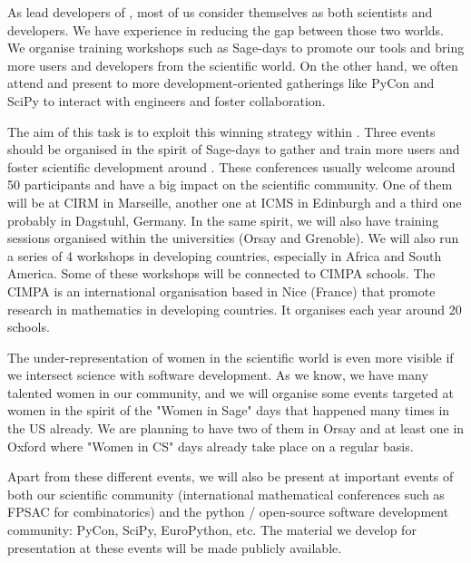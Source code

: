 \begin{workpackage}
\begin{tasklist}
\begin{task}[title=Dissemination: reaching towards users and fostering diversity, lead=PS,PM=12, partners={UB,USH,SA}, id=dissemination, wphases=0-48, issue=28]
  As lead developers of \TheProject, most of us consider themselves as
  both scientists and developers. We have experience in reducing the
  gap between those two worlds. We organise training workshops such
  as Sage-days to promote our tools and bring more users and
  developers from the scientific world. On the other hand, we often
  attend and present to more development-oriented gatherings like
  PyCon and SciPy to interact with engineers and foster
  collaboration.

  The aim of this task is to exploit this winning strategy within
  \TheProject. Three events should be organised in the spirit of
  Sage-days to gather and train more users and foster scientific
  development around \TheProject. These conferences usually welcome
  around 50 participants and have a big impact on the scientific
  community. One of them will be at CIRM in Marseille, another one at
  ICMS in Edinburgh and a third one probably in Dagstuhl, Germany. In
  the same spirit, we will also have training sessions organised
  within the universities (Orsay and Grenoble). We will also run a
  series of 4 workshops in developing countries, especially in Africa and
  South America. Some of these workshops will be connected to CIMPA
  schools.  The CIMPA is an international organisation based in Nice
  (France) that promote research in mathematics in developing
  countries. It organises each year around 20 schools.

  The under-representation of women in the scientific world is even
  more visible if we intersect science with software
  development. As we know, we have many talented women in our
  community, and we will organise some events targeted at women in the
  spirit of the "Women in Sage" days that happened many times in the
  US already. We are planning to have two of them in Orsay and at least
  one in Oxford where "Women in CS" days already take place on a regular basis.

  Apart from these different events, we will also be present at
  important events of both our scientific community (international
  mathematical conferences such as FPSAC for combinatorics) and the
  python / open-source software development community: PyCon, SciPy,
  EuroPython, etc. The material we develop for presentation at these
  events will be made publicly available.
\end{task}



\end{tasklist}
\end{workpackage}
